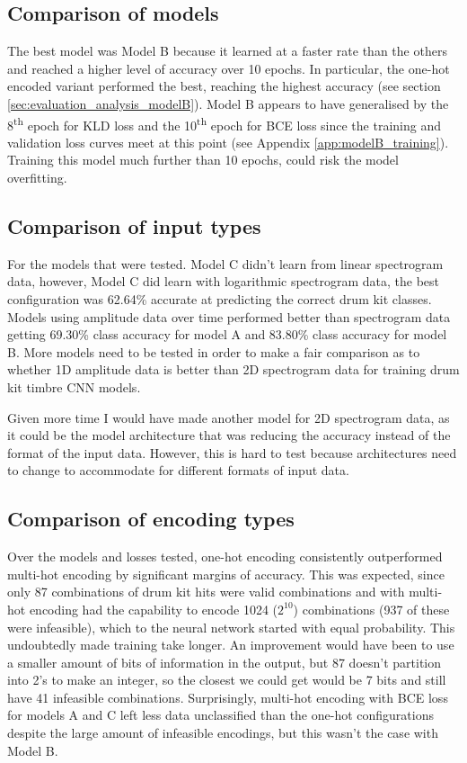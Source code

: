 \documentclass[12pt]{article}
\begin{document}
	\subsection{Comparison of models}
	The best model was Model B because it learned at a faster rate than the others and reached a higher level of accuracy over 10 epochs. In particular, the one-hot encoded variant performed the best, reaching the highest accuracy (see section \ref{sec:evaluation_analysis_modelB}). Model B appears to have generalised by the 8\textsuperscript{th} epoch for KLD loss and the 10\textsuperscript{th} epoch for BCE loss since the training and validation loss curves meet at this point (see Appendix \ref{app:modelB_training}). Training this model much further than 10 epochs, could risk the model overfitting.
	
	\subsection{Comparison of input types}
	
	For the models that were tested. Model C didn't learn from linear spectrogram data, however, Model C did learn with logarithmic spectrogram data, the best configuration was 62.64\% accurate at predicting the correct drum kit classes. Models using amplitude data over time performed better than spectrogram data getting 69.30\% class accuracy for model A and 83.80\% class accuracy for model B. More models need to be tested in order to make a fair comparison as to whether 1D amplitude data is better than 2D spectrogram data for training drum kit timbre CNN models.\medskip
	
	Given more time I would have made another model for 2D spectrogram data, as it could be the model architecture that was reducing the accuracy instead of the format of the input data. However, this is hard to test because architectures need to change to accommodate for different formats of input data. 
	
	\subsection{Comparison of encoding types}
	
	Over the models and losses tested, one-hot encoding consistently outperformed multi-hot encoding by significant margins of accuracy. This was expected, since only 87 combinations of drum kit hits were valid combinations and with multi-hot encoding had the capability to encode 1024 ($2^{10}$) combinations (937 of these were infeasible), which to the neural network started with equal probability. This undoubtedly made training take longer. An improvement would have been to use a smaller amount of bits of information in the output, but 87 doesn't partition into 2's to make an integer, so the closest we could get would be 7 bits and still have 41 infeasible combinations. Surprisingly, multi-hot encoding with BCE loss for models A and C left less data unclassified than the one-hot configurations despite the large amount of infeasible encodings, but this wasn't the case with Model B.
	
\end{document}
